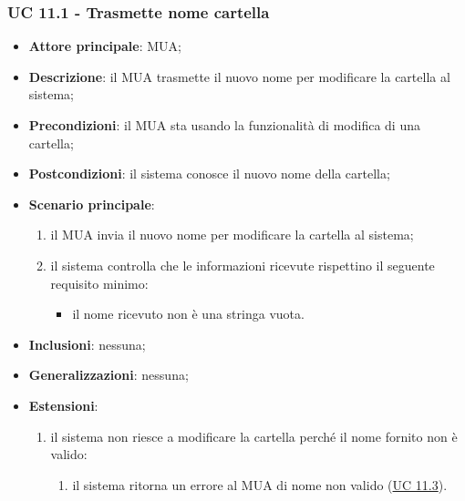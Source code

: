 \subsubsection{UC 11.1 - Trasmette nome cartella} \label{sec:UC11.1}
\begin{itemize}
    \item \textbf{Attore principale}: MUA;
    \item \textbf{Descrizione}: il MUA trasmette il nuovo nome per modificare la cartella al sistema;
    \item \textbf{Precondizioni}: il MUA sta usando la funzionalità di modifica di una cartella;
    \item \textbf{Postcondizioni}: il sistema conosce il nuovo nome della cartella;
    \item \textbf{Scenario principale}:
        \begin{enumerate}
            \item il MUA invia il nuovo nome per modificare la cartella al sistema;
            \item il sistema controlla che le informazioni ricevute rispettino il seguente requisito minimo:
            \begin{itemize}
                \item il nome ricevuto non è una stringa vuota.
            \end{itemize}
        \end{enumerate}
    \item \textbf{Inclusioni}: nessuna;
    \item \textbf{Generalizzazioni}: nessuna;
    \item \textbf{Estensioni}:
        \begin{enumerate}[label=\alph*.]
            \item il sistema non riesce a modificare la cartella perché il nome fornito non è valido:
            \begin{enumerate}[label=\arabic*.]
                \item il sistema ritorna un errore al MUA di nome non valido (\hyperref[sec:UC11.3]{UC 11.3}).
            \end{enumerate}
        \end{enumerate}
\end{itemize}

